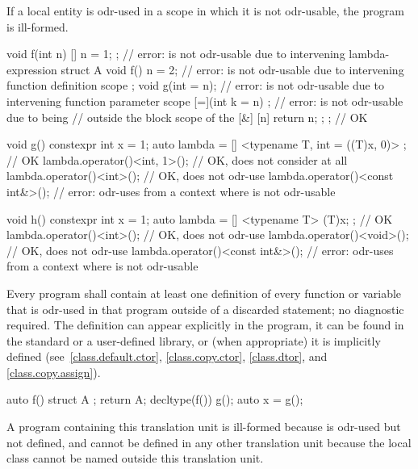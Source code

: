 If a local entity is odr-used
in a scope in which it is not odr-usable,
the program is ill-formed.
\begin{example}
\begin{codeblock}
void f(int n) {
  [] { n = 1; };                // error:  is not odr-usable due to intervening lambda-expression
  struct A {
    void f() { n = 2; }         // error:  is not odr-usable due to intervening function definition scope
  };
  void g(int = n);              // error:  is not odr-usable due to intervening function parameter scope
  [=](int k = n) {};            // error:  is not odr-usable due to being
                                // outside the block scope of the 
  [&] { [n]{ return n; }; };    // OK
}
\end{codeblock}
\end{example}

\pnum
\begin{example}
\begin{codeblock}
void g() {
  constexpr int x = 1;
  auto lambda = [] <typename T, int = ((T)x, 0)> {};    // OK
  lambda.operator()<int, 1>();          // OK, does not consider  at all
  lambda.operator()<int>();             // OK, does not odr-use 
  lambda.operator()<const int&>();      // error: odr-uses  from a context where  is not odr-usable
}

void h() {
  constexpr int x = 1;
  auto lambda = [] <typename T> { (T)x; };      // OK
  lambda.operator()<int>();             // OK, does not odr-use 
  lambda.operator()<void>();            // OK, does not odr-use 
  lambda.operator()<const int&>();      // error: odr-uses  from a context where  is not odr-usable
}
\end{codeblock}
\end{example}

\pnum
Every program shall contain at least one definition of every
function or variable that is odr-used in that program
outside of a discarded statement; no diagnostic required.
The definition can appear explicitly in the program, it can be found in
the standard or a user-defined library, or (when appropriate) it is
implicitly defined (see~\ref{class.default.ctor}, \ref{class.copy.ctor},
\ref{class.dtor}, and \ref{class.copy.assign}).
\begin{example}
\begin{codeblock}
auto f() {
  struct A {};
  return A{};
}
decltype(f()) g();
auto x = g();
\end{codeblock}
A program containing this translation unit is ill-formed
because  is odr-used but not defined,
and cannot be defined in any other translation unit
because the local class  cannot be named outside this
translation unit.
\end{example}

